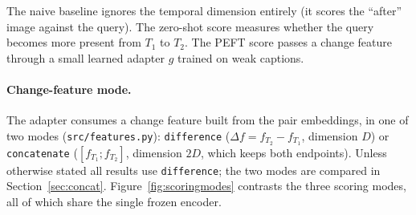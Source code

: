 \documentclass{article}
\begin{document}
The naive baseline ignores the temporal dimension entirely (it scores the
``after'' image against the query). The zero-shot score measures whether the
query becomes more present from $T_1$ to $T_2$. The PEFT score passes a
change feature through a small learned adapter $g$ trained on weak captions.

\paragraph{Change-feature mode.}
The adapter consumes a change feature built from the pair embeddings, in one of
two modes (\texttt{src/features.py}): \texttt{difference}
($\Delta f = f_{T_2} - f_{T_1}$, dimension $D$) or \texttt{concatenate}
($[f_{T_1} ; f_{T_2}]$, dimension $2D$, which keeps both endpoints). Unless
otherwise stated all results use \texttt{difference}; the two modes are compared
in Section~\ref{sec:concat}. Figure~\ref{fig:scoringmodes} contrasts the three
scoring modes, all of which share the single frozen encoder.
\end{document}
